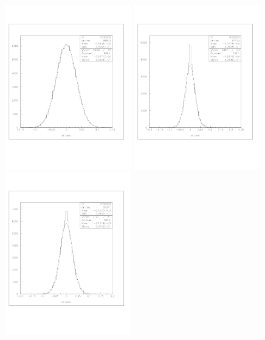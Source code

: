 \documentclass[a4paper]{article}
\begin{document}
\begin{figure}[!htb]
  \centering
  \includegraphics[width=0.49\textwidth]{ex_images/1_010_010_xse.jpg}
  \includegraphics[width=0.49\textwidth]{ex_images/1_010_030_xse.jpg}
  \includegraphics[width=0.49\textwidth]{ex_images/1_010_050_xse.jpg}

\end{figure}
\end{document}
